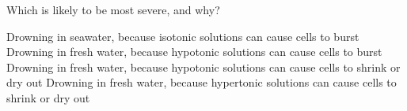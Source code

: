 \documentclass[quiz,addpoints,noanswers]{exam}
\begin{document}
\begin{questions}
\question[1] Which is likely to be most severe, and why?
\begin{choices}
\choice Drowning in seawater, because isotonic solutions can cause cells to burst
\CorrectChoice Drowning in fresh water, because hypotonic solutions can cause cells to burst
\choice Drowning in fresh water, because hypotonic solutions can cause cells to shrink or dry out
\choice Drowning in fresh water, because  hypertonic solutions can cause cells to shrink or dry out
\end{choices}


\end{questions}
\end{document}
